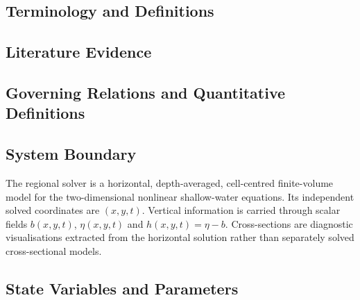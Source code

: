 \subsection{Terminology and Definitions}
\label{sec:res-mod-spec-definitions}


\subsection{Literature Evidence}
\label{sec:res-mod-spec-literature-evidence}

%

\subsection{Governing Relations and Quantitative Definitions}
\label{sec:res-mod-spec-governing-relations}

%

\subsection{System Boundary}
\label{sec:res-mod-spec-system-boundary}

The regional solver is a horizontal, depth-averaged,
cell-centred finite-volume model for the two-dimensional nonlinear
shallow-water equations. Its independent solved coordinates are
$(x,y,t)$. Vertical information is carried through scalar fields
$b(x,y,t)$, $\eta(x,y,t)$ and $h(x,y,t)=\eta-b$. Cross-sections are
diagnostic visualisations extracted from the horizontal solution rather
than separately solved cross-sectional models.

\subsection{State Variables and Parameters}
\label{sec:res-mod-spec-state-variables-parameters}

